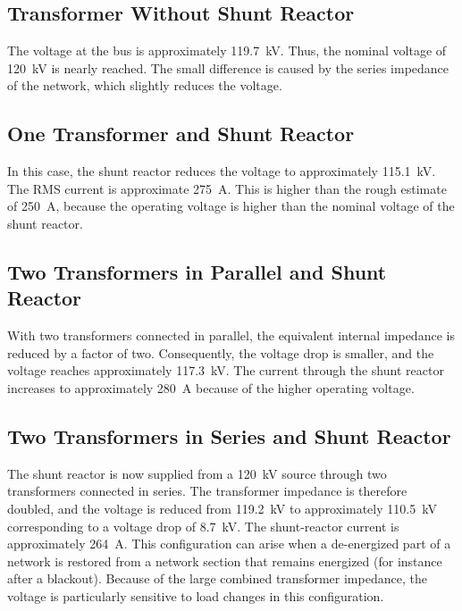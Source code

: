 \subsection{Transformer Without Shunt Reactor}
\label{sec:without-shunt-reactor}

The voltage at the bus is approximately \SI{119.7}{\kilo\volt}. Thus, the nominal voltage of \SI{120}{\kilo\volt} is nearly reached. The small difference is caused by the series impedance of the network, which slightly reduces the voltage. 

\subsection{One Transformer and Shunt Reactor}
\label{sec:one-transformer-shunt-reactor}

In this case, the shunt reactor reduces the voltage to approximately \SI{115.1}{\kilo\volt}. The RMS current is approximate \SI{275}{\ampere}. This is higher than the rough estimate of \SI{250}{\ampere}, because the operating voltage is higher than the nominal voltage of the shunt reactor.

\subsection{Two Transformers in Parallel and Shunt Reactor}
\label{sec:parallel-transformers-shunt-reactor}

With two transformers connected in parallel, the equivalent internal impedance is reduced by a factor of two. Consequently, the voltage drop is smaller, and the voltage reaches approximately \SI{117.3}{\kilo\volt}. The current through the shunt reactor increases to approximately \SI{280}{\ampere} because of the higher operating voltage.

\subsection{Two Transformers in Series and Shunt Reactor}
\label{sec:series-transformers-shunt-reactor}

The shunt reactor is now supplied from a \SI{120}{\kilo\volt} source through two transformers connected in series. The transformer impedance is therefore doubled, and the voltage is reduced from \SI{119.2}{\kilo\volt} to approximately \SI{110.5}{\kilo\volt} corresponding to a voltage drop of \SI{8.7}{\kilo\volt}. The shunt-reactor current is approximately \SI{264}{\ampere}.
This configuration can arise when a de-energized part of a network is restored from a network section that remains energized (for instance after a blackout). Because of the large combined transformer impedance, the voltage is particularly sensitive to load changes in this configuration.

